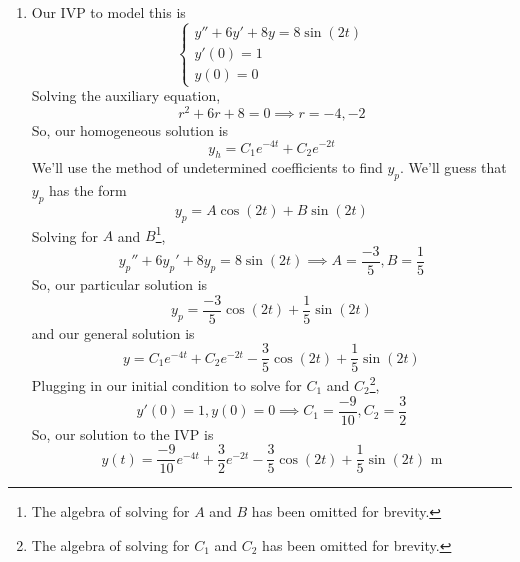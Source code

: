 \begin{enumerate}[label=\arabic*.]
			\begin{enumerate}[label=(\alph*)]
				\item
					Our IVP to model this is
					\begin{equation*}
						\begin{cases}
							y'' + 6y' + 8y = 8\sin{(2t)} \\
							y'(0) = 1 \\
							y(0) = 0
						\end{cases}
					\end{equation*}
					Solving the auxiliary equation,
					\begin{equation*}
						r^2 + 6r + 8 = 0 \implies r = -4, -2
					\end{equation*}
					So, our homogeneous solution is
					\begin{equation*}
						y_h = C_1e^{-4t} + C_2e^{-2t}
					\end{equation*}
					We'll use the method of undetermined coefficients to find $y_p$. We'll guess that $y_p$ has the form
					\begin{equation*}
						y_p = A\cos{(2t)} + B\sin{(2t)}
					\end{equation*}
					Solving for $A$ and $B$\footnote{The algebra of solving for $A$ and $B$ has been omitted for brevity.},
					\begin{equation*}
						y_p'' + 6y_p' + 8y_p = 8\sin{(2t)} \implies A = \frac{-3}{5}, B = \frac{1}{5}
					\end{equation*}
					So, our particular solution is
					\begin{equation*}
						y_p = \frac{-3}{5}\cos{(2t)} + \frac{1}{5}\sin{(2t)}
					\end{equation*}
					and our general solution is
					\begin{equation*}
						y = C_1e^{-4t} + C_2e^{-2t} - \frac{3}{5}\cos{(2t)} + \frac{1}{5}\sin{(2t)}
					\end{equation*}
					Plugging in our initial condition to solve for $C_1$ and $C_2$\footnote{The algebra of solving for $C_1$ and $C_2$ has been omitted for brevity.},
					\begin{equation*}
						y'(0) = 1, y(0) = 0 \implies C_1 = \frac{-9}{10}, C_2 = \frac{3}{2}
					\end{equation*}
					So, our solution to the IVP is
					\begin{equation*}
						y(t) = \frac{-9}{10}e^{-4t} + \frac{3}{2}e^{-2t} - \frac{3}{5}\cos{(2t)} + \frac{1}{5}\sin{(2t)} \text{ m}
					\end{equation*}

\end{enumerate}
\end{enumerate}

